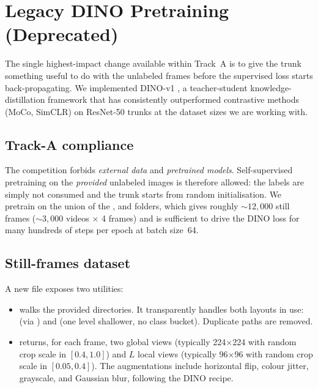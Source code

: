 \section{Legacy DINO Pretraining (Deprecated)}
\label{sec:phase3dino}

The single highest-impact change available within Track~A is to give the
trunk something useful to do with the unlabeled frames before the
supervised loss starts back-propagating. We implemented DINO-v1
\cite{Caron2021DINO}, a teacher-student knowledge-distillation framework
that has consistently outperformed contrastive methods (MoCo, SimCLR) on
ResNet-50 trunks at the dataset sizes we are working with.

\subsection{Track-A compliance}

The competition forbids \emph{external data} and \emph{pretrained
models}. Self-supervised pretraining on the \emph{provided} unlabeled
images is therefore allowed: the labels are simply not consumed and the
trunk starts from random initialisation. We pretrain on the union of the
,  and  folders, which gives roughly
\(\sim 12{,}000\) still frames (\(\sim 3{,}000\) videos
\(\times\) 4 frames) and is sufficient to drive the DINO loss for many
hundreds of steps per epoch at batch size~64.

\subsection{Still-frames dataset}
\label{sec:phase3dino:dataset}

A new file 
exposes two utilities:

\begin{itemize}[leftmargin=2em]
\item {} walks the provided
      directories. It transparently handles both layouts in use:
       (via
      ) and
       (one level shallower, no class
      bucket). Duplicate paths are removed.
\item {} returns, for each frame, two
      global views (typically 224\(\times\)224 with random crop scale in
      \([0.4, 1.0]\)) and \(L\) local views (typically 96\(\times\)96
      with random crop scale in \([0.05, 0.4]\)). The augmentations
      include horizontal flip, colour jitter, grayscale, and Gaussian
      blur, following the DINO recipe.
\end{itemize}

